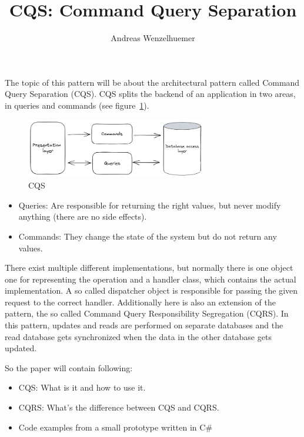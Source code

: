 \documentclass{article}
\title{CQS: Command Query Separation}
\author{Andreas Wenzelhuemer}
\begin{document}
\maketitle

The topic of this pattern will be about the architectural pattern called Command Query Separation (CQS).
CQS splits the backend of an application in two areas, in queries and commands (see figure~\ref{fig:cqs}).

\begin{figure}
    \centering
    \includegraphics[width=0.7\textwidth]{images/CQS.png}
    \caption{CQS}
    \label{fig:cqs}
\end{figure}

\begin{itemize}
    \item {Queries: Are responsible for returning the right values, but never modify anything (there are no side effects).}
    \item {Commands: They change the state of the system but do not return any values.}
\end{itemize}

There exist multiple different implementations, but normally there is one object one for representing the operation and a handler class, which contains the actual implementation.
A so called dispatcher object is responsible for passing the given request to the correct handler.
Additionally here is also an extension of the pattern, the so called Command Query Responsibility Segregation (CQRS).
In this pattern, updates and reads are performed on separate databases and the read database gets synchronized when the data in the other database gets updated.

So the paper will contain following:
\begin{itemize}
    \item {CQS: What is it and how to use it.}
    \item {CQRS: What's the difference between CQS and CQRS.}
    \item {Code examples from a small prototype written in C\#}
\end{itemize}
\end{document}
